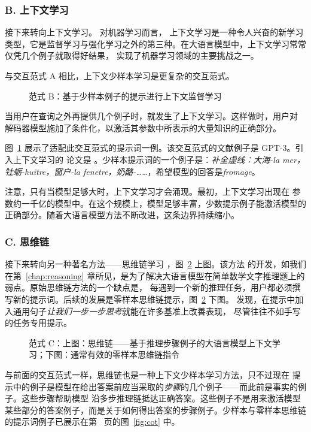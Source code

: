 \subsubsection{B. 上下文学习}
接下来转向上下文学习。%
对机器学习而言，
上下文学习是一种令人兴奋的新学习类型，它是监督学习与强化学习之外的第三种。在大语言模型中，上下文学习常常仅凭几个例子就取得好结果，
实现了机器学习领域的主要挑战之一。

与交互范式 A 相比，上下文少样本学习是更复杂的交互范式。
\begin{figure}
  \begin{center}
    
    \caption{范式 B：基于少样本例子的提示进行上下文监督学习}\label{fig:rlB}
  \end{center}
\end{figure}
当用户在查询之外再提供几个例子时，就发生了上下文学习。这样做时，用户对
解码器模型施加了条件化，以激活其参数中所表示的大量知识的正确部分。

图~\ref{fig:rlB} 展示了适配此交互范式的提示词一例。该交互范式的文献例子是 GPT-3。引入上下文学习的
论文是
\citet{brown2020language}。少样本提示词的一个例子是：{\em 补全虚线：大海-la mer，牡蛎-huitre，窗户-la fenetre，奶酪-……}，希望模型的回答是{\em fromage}。

注意，只有当模型足够大时，上下文学习才会涌现。最初，上下文学习出现在
参数约一千亿的模型中。在这个规模上，模型足够丰富，少数提示例子能激活模型的正确部分。随着大语言模型方法不断改进，这条边界持续缩小。

\subsubsection{C. 思维链}
接下来转向另一种著名方法——思维链学习 \citep{wei2022chain}，图~\ref{fig:rlC} 上图。该方法
的开发，如我们在第~\ref{chap:reasoning} 章所见，是为了解决大语言模型在简单数学文字推理题上的弱点。原始思维链方法的一个缺点是，
每遇到一个新的推理任务，用户都必须撰写新的提示词。后续的发展是零样本思维链提示，图~\ref{fig:rlC} 下图。\citet{kojima2022large} 发现，在提示中加入通用句子{\em 让我们一步一步思考}就能在许多基准上改善表现，
尽管往往不如手写的任务专用提示。

\begin{figure}
  \begin{center}
    
    \caption{范式 C：上图：思维链——基于推理步骤例子的大语言模型上下文学习；下图：通常有效的零样本思维链指令}\label{fig:rlC}
  \end{center}
\end{figure}
与前面的交互范式一样，思维链也是一种上下文少样本学习方法，只不过现在
提示中的例子是模型在给出答案前应当采取的{\em 步骤}的几个例子——而此前是事实的例子。这些步骤帮助模型
沿多步推理链抵达正确答案。这些例子不是用来激活模型某些部分的答案例子，而是关于如何得出答案的步骤例子。少样本与零样本思维链的提示词例子已展示在第~\pageref{fig:cot} 页的图~\ref{fig:cot} 中。 %


